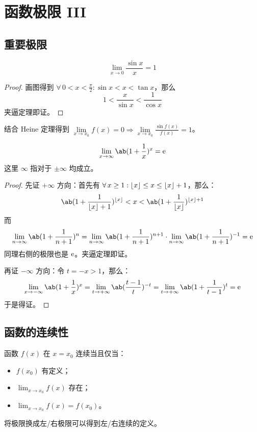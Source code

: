 \section{函数极限 III}

\subsection{重要极限}

\begin{theorem}
	$$
	\lim_{x \to 0} \frac{\sin x}{x} = 1
	$$
	\begin{proof}
		画图得到 $\forall\,0 < x < \frac{\pi}{2}: \sin x < x < \tan x$，那么
		$$
		1 < \frac{x}{\sin x} < \frac{1}{\cos x}
		$$
		夹逼定理即证。
	\end{proof}
\end{theorem}

结合 Heine 定理得到 $\lim\limits_{x \to x_0} f(x) = 0 \Rightarrow \lim\limits_{x \to x_0} \frac{\sin f(x)}{f(x)} = 1$。

\begin{theorem}
	$$
	\lim_{x \to \infty} \ab(1 + \frac{1}{x})^x = \E
	$$
	这里 $\infty$ 指对于 $\pm\infty$ 均成立。

	\begin{proof}
		先证 $+\infty$ 方向：首先有 $\forall\,x \ge 1: \lfloor x\rfloor \le x \le \lfloor x\rfloor + 1$，那么：
		$$
		\ab(1 + \frac{1}{\floor{x} + 1})^{\floor{x}} < x < \ab(1 + \frac{1}{\floor{x}})^{\floor{x} + 1}
		$$
		而
		$$
		\lim_{n \to \infty} \ab(1 + \frac{1}{n + 1})^n = \lim_{n \to \infty} \ab(1 + \frac{1}{n + 1})^{n + 1} \cdot \lim_{n \to \infty} \ab(1 + \frac{1}{n + 1})^{-1} = \E
		$$
		同理右侧的极限也是 $\mathrm{e}$。夹逼定理即证。

		再证 $-\infty$ 方向：令 $t = -x > 1$，那么：
		$$
		\lim_{x \to -\infty} \ab(1 + \frac{1}{x})^x = \lim_{t \to +\infty} \ab(\frac{t - 1}{t})^{-t} = \lim_{t \to +\infty} \ab(1 + \frac{1}{t - 1})^t = \E
		$$
		于是得证。
	\end{proof}
\end{theorem}

\subsection{函数的连续性}

\begin{definition}[函数的连续性]
	函数 $f(x)$ 在 $x = x_0$ 连续当且仅当：

	\begin{itemize}
		\item $f(x_0)$ 有定义；
		\item $\lim_{x \to x_0} f(x)$ 存在；
		\item $\lim_{x \to x_0} f(x) = f(x_0)$。
	\end{itemize}

	将极限换成左/右极限可以得到左/右连续的定义。
\end{definition}

